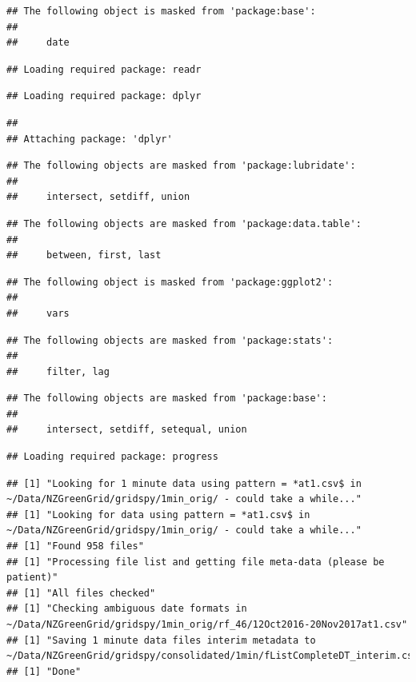 \documentclass[]{article}
\begin{document}
\begin{verbatim}
## The following object is masked from 'package:base':
## 
##     date
\end{verbatim}

\begin{verbatim}
## Loading required package: readr
\end{verbatim}

\begin{verbatim}
## Loading required package: dplyr
\end{verbatim}

\begin{verbatim}
## 
## Attaching package: 'dplyr'
\end{verbatim}

\begin{verbatim}
## The following objects are masked from 'package:lubridate':
## 
##     intersect, setdiff, union
\end{verbatim}

\begin{verbatim}
## The following objects are masked from 'package:data.table':
## 
##     between, first, last
\end{verbatim}

\begin{verbatim}
## The following object is masked from 'package:ggplot2':
## 
##     vars
\end{verbatim}

\begin{verbatim}
## The following objects are masked from 'package:stats':
## 
##     filter, lag
\end{verbatim}

\begin{verbatim}
## The following objects are masked from 'package:base':
## 
##     intersect, setdiff, setequal, union
\end{verbatim}

\begin{verbatim}
## Loading required package: progress
\end{verbatim}

\begin{verbatim}
## [1] "Looking for 1 minute data using pattern = *at1.csv$ in ~/Data/NZGreenGrid/gridspy/1min_orig/ - could take a while..."
## [1] "Looking for data using pattern = *at1.csv$ in ~/Data/NZGreenGrid/gridspy/1min_orig/ - could take a while..."
## [1] "Found 958 files"
## [1] "Processing file list and getting file meta-data (please be patient)"
## [1] "All files checked"
## [1] "Checking ambiguous date formats in ~/Data/NZGreenGrid/gridspy/1min_orig/rf_46/12Oct2016-20Nov2017at1.csv"
## [1] "Saving 1 minute data files interim metadata to ~/Data/NZGreenGrid/gridspy/consolidated/1min/fListCompleteDT_interim.csv"
## [1] "Done"
\end{verbatim}
\end{document}
